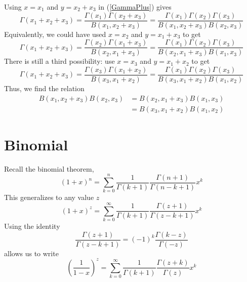 Using $x = x_{1}$ and $y = x_{2} + x_{3}$ in (\ref{GammaPlus}) gives
\begin{equation}
	\Gamma(x_{1} + x_{2} + x_{3}) = \frac{\Gamma(x_{1}) \Gamma(x_{2} + x_{3})}{B(x_{1}, x_{2} + x_{3})} = \frac{\Gamma(x_{1}) \Gamma(x_{2}) \Gamma(x_{3})}{B(x_{1}, x_{2} + x_{3}) B(x_{2}, x_{3})}
\end{equation}
Equivalently, we could have used $x = x_{2}$ and $y = x_{1} + x_{3}$ to get
\begin{equation}
	\Gamma(x_{1} + x_{2} + x_{3}) = \frac{\Gamma(x_{2}) \Gamma(x_{1} + x_{3})}{B(x_{2}, x_{1} + x_{3})} = \frac{\Gamma(x_{1}) \Gamma(x_{2}) \Gamma(x_{3})}{B(x_{2}, x_{1} + x_{3}) B(x_{1}, x_{3})}
\end{equation}
There is still a third possibility: use $x = x_{3}$ and $y = x_{1} + x_{2}$ to get
\begin{equation}
	\Gamma(x_{1} + x_{2} + x_{3}) = \frac{\Gamma(x_{3}) \Gamma(x_{1} + x_{2})}{B(x_{3}, x_{1} + x_{2})} = \frac{\Gamma(x_{1}) \Gamma(x_{2}) \Gamma(x_{3})}{B(x_{3}, x_{1} + x_{2}) B(x_{1}, x_{2})}
\end{equation}
Thus, we find the relation
\begin{equation}
\begin{split}
	B(x_{1}, x_{2} + x_{3}) B(x_{2}, x_{3}) &= B(x_{2}, x_{1} + x_{3}) B(x_{1}, x_{3}) \\
	&= B(x_{3}, x_{1} + x_{2}) B(x_{1}, x_{2})
\end{split}
\end{equation}
\section{Binomial}
Recall the binomial theorem,
\begin{equation}
	(1 + x)^{n} = \sum_{k = 0}^{n} \frac{1}{\Gamma(k+1)} \frac{\Gamma(n + 1)}{\Gamma(n - k + 1)} x^{k}
\end{equation}
This generalizes to any value $z$
\begin{equation}
	(1 + x)^{z} = \sum_{k = 0}^{\infty} \frac{1}{\Gamma(k+1)} \frac{\Gamma(z + 1)}{\Gamma(z - k + 1)} x^{k}
\end{equation}
Using the identity
\begin{equation}
	\frac{\Gamma(z + 1)}{\Gamma(z - k + 1)} = (-1)^{k} \frac{\Gamma(k - z)}{\Gamma(-z)}
\end{equation}
allows us to write
\begin{equation}
	\left( \frac{1}{1 - x} \right)^{z} = \sum_{k = 0}^{\infty} \frac{1}{\Gamma(k + 1)} \frac{\Gamma(z + k)}{\Gamma(z)} x^{k}
\end{equation}

